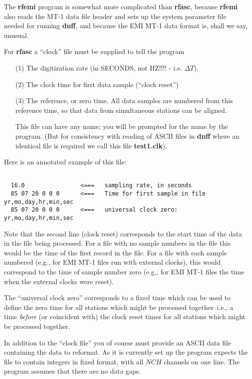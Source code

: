 The {\bf rfemi} program is somewhat more 
complicated than {\bf rfasc}, because
{\bf rfemi} also reads the MT-1 
data file header and sets up the system parameter
file needed for running {\bf dnff}, and because the
EMI MT-1 data format is, shall we say, unusual.

For {\bf rfasc} a ``clock'' file must be supplied to tell the program
\begin{itemize}
\item[(1)]
The digitization rate (in SECONDS, not HZ!!!! - i.e. $\Delta T$).
\item[(2)]
The clock time for first data sample (``clock reset'')
\item[(3)]
The reference, or zero time. All data samples are numbered from
this reference time, so that data from simultaneous stations
can be aligned.

This file can have any name; you will be prompted for the name by
the program.  (But for consistency with reading of ASCII
files in {\bf dnff} where an identical file is required we 
call this file {\bf test1.clk}).

\end{itemize}

Here is an annotated example of this file:
\small

\begin{verbatim}

  16.0                <===   sampling rate, in seconds
  85 07 20 0 0 0      <===   Time for first sample in file yr,mo,day,hr,min,sec
  85 07 20 0 0 0      <===   universal clock zero: yr,mo,day,hr,min,sec
\end{verbatim}
\normalsize

Note that the second line (clock reset) corresponds to the start 
time of the data in the file being processed.
For a file with no sample numbers in the file this would be the
time of the first record in the file.  For a file with each sample
numbered (e.g., for EMI MT-1 files run with external clocks),
this would correspond to the time of sample number zero
(e.g., for EMI MT-1 files the time when the external clocks were reset).

The ``universal clock zero'' corresponds to a fixed time which can
be used to define the zero time for all stations which might be
processed together--i.e., a time {\it before} (or coincident
with) the clock reset
times for all stations which might be processed together.

In addition to the ``clock file'' you of course must provide an ASCII
data file containing the data to reformat.  As it is currently set up
the program expects the file to contain integers in fixed format,
with all $NCH$ channels on one line.
The program assumes that there are no data gaps.  

